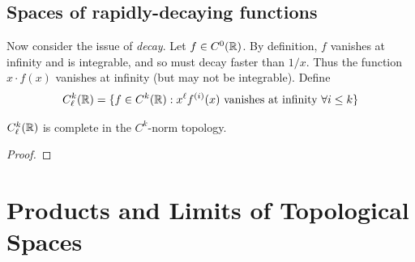     \subsection{Spaces of rapidly-decaying functions}
      Now consider the issue of \emph{decay}.
      Let $f\in C^0(\mathbb{R})$.
      By definition, $f$ vanishes at infinity and is integrable, and so must decay faster than $1/x$.
      Thus the function $x\cdot f(x)$ vanishes at infinity (but may not be integrable).
      Define
      \begin{align*}
        C^k_\ell(\mathbb{R}) = \{f\in C^k(\mathbb{R}):x^\ell f^{(i)}(x)\text{ vanishes at infinity }\forall i\le k\}
      \end{align*}
      \begin{thm}
        $C^k_\ell(\mathbb{R})$ is complete in the $C^k$-norm topology.
        \begin{proof}
        \end{proof}
      \end{thm}

    \section{Products and Limits of Topological Spaces}


